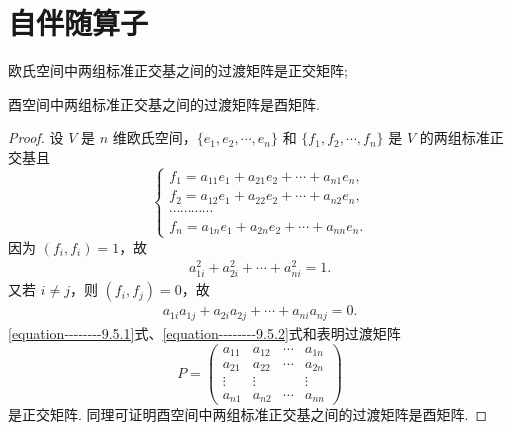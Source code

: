 \documentclass[../../main.tex]{subfiles}%
\begin{document}
\section{自伴随算子}

\begin{lemma}\label{lemma:正交基之间的过渡矩阵是正交(酉)矩阵}
欧氏空间中两组标准正交基之间的过渡矩阵是正交矩阵;

酉空间中两组标准正交基之间的过渡矩阵是酉矩阵.
\end{lemma}
\begin{proof}

设 $V$ 是 $n$ 维欧氏空间，$\{e_1,e_2,\cdots,e_n\}$ 和 $\{f_1,f_2,\cdots,f_n\}$ 是 $V$ 的两组标准正交基且
\[
\begin{cases}
f_1 = a_{11}e_1 + a_{21}e_2 + \cdots + a_{n1}e_n, \\
f_2 = a_{12}e_1 + a_{22}e_2 + \cdots + a_{n2}e_n, \\
\cdots\cdots\cdots\cdots \\
f_n = a_{1n}e_1 + a_{2n}e_2 + \cdots + a_{nn}e_n.
\end{cases}
\]
因为 $(f_i,f_i) = 1$，故
\begin{align}
a_{1i}^2 + a_{2i}^2 + \cdots + a_{ni}^2 = 1.\label{equation--------9.5.1}
\end{align}
又若 $i \neq j$，则 $(f_i,f_j) = 0$，故
\begin{align}
a_{1i}a_{1j} + a_{2i}a_{2j} + \cdots + a_{ni}a_{nj} = 0.\label{equation--------9.5.2}
\end{align}
\eqref{equation--------9.5.1}式、\eqref{equation--------9.5.2}式和表明过渡矩阵
\[
P = \begin{pmatrix}
a_{11} & a_{12} & \cdots & a_{1n} \\
a_{21} & a_{22} & \cdots & a_{2n} \\
\vdots & \vdots & & \vdots \\
a_{n1} & a_{n2} & \cdots & a_{nn}
\end{pmatrix}
\]
是正交矩阵. 同理可证明酉空间中两组标准正交基之间的过渡矩阵是酉矩阵.

\end{proof}
\end{document}
